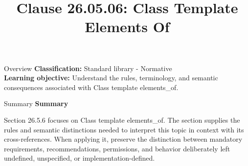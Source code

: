 \documentclass[10pt,letterpaper]{article}
\title{Clause 26.05.06: Class Template Elements Of}
\author{}
\date{}
\begin{document}
\maketitle
\begin{CornellOverviewBox}{Overview}
\textbf{Classification:} Standard library - Normative\\[2pt]
\textbf{Learning objective:} Understand the rules, terminology, and semantic consequences associated with Class template elements\_of.
\end{CornellOverviewBox}\begin{CornellSummaryBox}{Summary}
{\sffamily\bfseries\color{Accent} Summary}\par\vspace{3pt}Section 26.5.6 focuses on Class template elements\_of. The section supplies the rules and semantic distinctions needed to interpret this topic in context with its cross-references. When applying it, preserve the distinction between mandatory requirements, recommendations, permissions, and behavior deliberately left undefined, unspecified, or implementation-defined.
\end{CornellSummaryBox}
\end{document}
